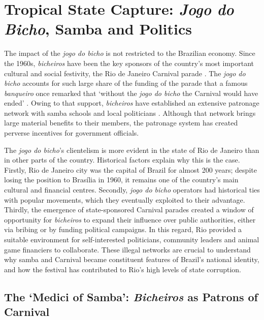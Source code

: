 \documentclass[a4paper,12pt]{article}
\begin{document}
\section{Tropical State Capture: \emph{Jogo do Bicho}, Samba and Politics}
\label{sec:capture}

The impact of the \emph{jogo do bicho} is not restricted to the Brazilian economy. Since the 1960s, \emph{bicheiros} have been the key sponsors of the country's most important cultural and social festivity, the Rio de Janeiro Carnival parade \citep{bezerra2009mecenato,cavalcanti2006carnaval,chinelli1993vazio,queiroz1992carnaval}. The \emph{jogo do bicho} accounts for such large share of the funding of the parade that a famous \emph{banqueiro} once remarked that `without the \emph{jogo do bicho} the Carnival would have ended' \citep{odia2016aniz}. Owing to that support, \emph{bicheiros} have established an extensive patronage network with samba schools and local politicians \citetext{\citealp[4641]{arguello2012criminalizaccao}; \citealp{congressoemfoco2007bicho}; \citealp{jornaldobrasil2011bicho}; \citealp[16]{misse2011crime}}. Although that network brings large material benefits to their members, the patronage system has created perverse incentives for government officials.

The \emph{jogo do bicho}'s clientelism is more evident in the state of Rio de Janeiro than in other parts of the country. Historical factors explain why this is the case. Firstly, Rio de Janeiro city was the capital of Brazil for almost 200 years; despite losing the position to Brasília in 1960, it remains one of the country's main cultural and financial centres. Secondly, \emph{jogo do bicho} operators had historical ties with popular movements, which they eventually exploited to their advantage. Thirdly, the emergence of state-sponsored Carnival parades created a window of opportunity for \emph{bicheiros} to expand their influence over public authorities, either via bribing or by funding political campaigns. In this regard, Rio provided a suitable environment for self-interested politicians, community leaders and animal game financiers to collaborate. These illegal networks are crucial to understand why samba and Carnival became constituent features of Brazil's national identity, and how the festival has contributed to Rio's high levels of state corruption.

\subsection{The `Medici of Samba': \emph{Bicheiros} as Patrons of Carnival}
\label{sub:patrons}
\end{document}
